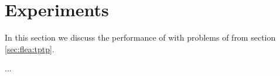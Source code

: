\newpage
\section{Experiments}\label{sec:flea:evaluation}

In this section we discuss the performance of \FLEA with problems of \TPTP from section \vref{sec:flea:tptp}.

\newpage
...
\newpage



